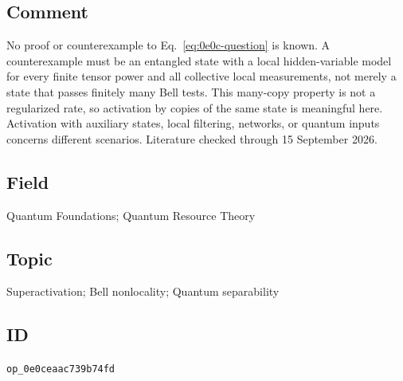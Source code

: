 \subsection*{Comment}

No proof or counterexample to Eq.~\eqref{eq:0e0c-question} is known.  A
counterexample must be an entangled state with a local hidden-variable model
for every finite tensor power and all collective local measurements, not
merely a state that passes finitely many Bell tests.  This many-copy property
is not a regularized rate, so activation by copies of the same state is
meaningful here.  Activation with auxiliary states, local filtering, networks,
or quantum inputs concerns different scenarios.  Literature checked through 15 September 2026.

\subsection*{Field}

Quantum Foundations; Quantum Resource Theory

\subsection*{Topic}

Superactivation; Bell nonlocality; Quantum separability

\subsection*{ID}

\texttt{op\_0e0ceaac739b74fd}
